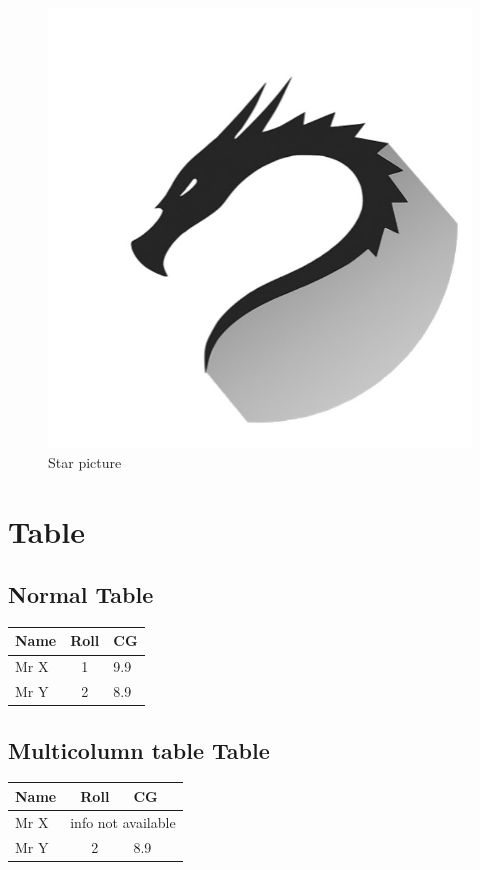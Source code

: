 \documentclass[letter, 12pt]{article}
\begin{document}
\begin{figure}[h]
	\centering
	\includegraphics[scale=0.2]{star.png}
	\caption{Star picture}
	\label{pic:star}
\end{figure}

\section{Table}

\subsection{Normal Table}

\begin{tabular}{|l|cl|}
	\hline
	Name & Roll & CG   \\
	\hline
	Mr X & 1   &  9.9 \\ 
	\cline{2-3}
	Mr Y & 2   &  8.9 \\ 
	\cline{2-3}
\end{tabular}


\subsection{Multicolumn table Table}


\begin{tabular}{|l|cl|}
	\hline
	Name & Roll & CG   \\
	\hline
	Mr X & \multicolumn{2}{c|}{info not available} \\ 
	\cline{2-3}
	Mr Y & 2   &  8.9 \\ 
	\cline{2-3}
\end{tabular}
\end{document}
